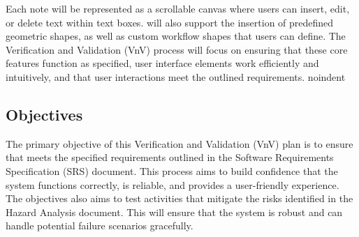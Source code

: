 \documentclass[12pt, titlepage]{article}
\begin{document}
\noindent Each note will be represented as a scrollable canvas where users can insert,
edit, or delete text within text boxes. \progname{} will also support the insertion of
predefined geometric shapes, as well as custom workflow shapes that users can
define. The Verification and Validation (VnV) process will focus on ensuring
that these core features function as specified, user interface elements work
efficiently and intuitively, and that user interactions meet the outlined
requirements.
noindent
\subsection{Objectives}




The primary objective of this Verification and Validation (VnV) plan is to
ensure that \progname{} meets the specified requirements outlined in the Software
Requirements Specification (SRS) document. This process aims to build confidence
that the system functions correctly, is reliable, and provides a user-friendly
experience. The objectives also aims to test activities that mitigate the risks
identified in the Hazard Analysis document. This will ensure that the system is
robust and can handle potential failure scenarios gracefully.

\vspace{1em}
\end{document}
